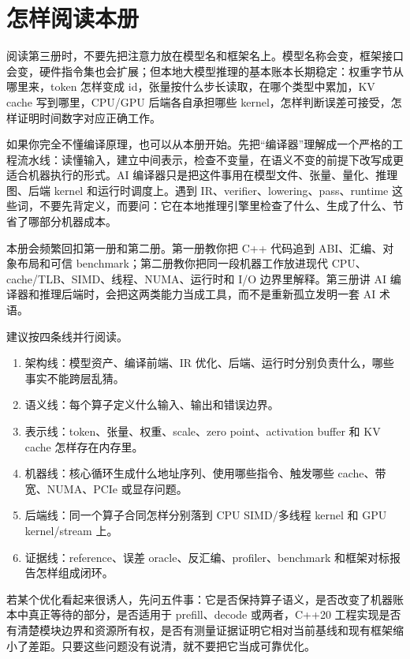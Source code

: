 \chapter*{怎样阅读本册}

阅读第三册时，不要先把注意力放在模型名和框架名上。模型名称会变，框架接口会变，硬件指令集也会扩展；但本地大模型推理的基本账本长期稳定：权重字节从哪里来，token 怎样变成 id，张量按什么步长读取，在哪个类型中累加，KV cache 写到哪里，CPU/GPU 后端各自承担哪些 kernel，怎样判断误差可接受，怎样证明时间数字对应正确工作。

如果你完全不懂编译原理，也可以从本册开始。先把“编译器”理解成一个严格的工程流水线：读懂输入，建立中间表示，检查不变量，在语义不变的前提下改写成更适合机器执行的形式。AI 编译器只是把这件事用在模型文件、张量、量化、推理图、后端 kernel 和运行时调度上。遇到 IR、verifier、lowering、pass、runtime 这些词，不要先背定义，而要问：它在本地推理引擎里检查了什么、生成了什么、节省了哪部分机器成本。

本册会频繁回扣第一册和第二册。第一册教你把 C++ 代码追到 ABI、汇编、对象布局和可信 benchmark；第二册教你把同一段机器工作放进现代 CPU、cache/TLB、SIMD、线程、NUMA、运行时和 I/O 边界里解释。第三册讲 AI 编译器和推理后端时，会把这两类能力当成工具，而不是重新孤立发明一套 AI 术语。

建议按四条线并行阅读。

\begin{enumerate}
  \item 架构线：模型资产、编译前端、IR 优化、后端、运行时分别负责什么，哪些事实不能跨层乱猜。
  \item 语义线：每个算子定义什么输入、输出和错误边界。
  \item 表示线：token、张量、权重、scale、zero point、activation buffer 和 KV cache 怎样存在内存里。
  \item 机器线：核心循环生成什么地址序列、使用哪些指令、触发哪些 cache、带宽、NUMA、PCIe 或显存问题。
  \item 后端线：同一个算子合同怎样分别落到 CPU SIMD/多线程 kernel 和 GPU kernel/stream 上。
  \item 证据线：reference、误差 oracle、反汇编、profiler、benchmark 和框架对标报告怎样组成闭环。
\end{enumerate}

若某个优化看起来很诱人，先问五件事：它是否保持算子语义，是否改变了机器账本中真正等待的部分，是否适用于 prefill、decode 或两者，C++20 工程实现是否有清楚模块边界和资源所有权，是否有测量证据证明它相对当前基线和现有框架缩小了差距。只要这些问题没有说清，就不要把它当成可靠优化。

